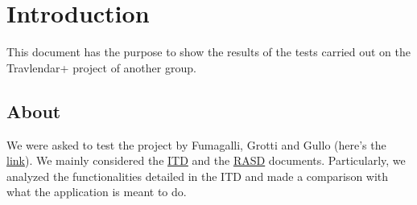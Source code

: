 \chapter{Introduction}
\label{cha:intro}

This document has the purpose to show the results of the tests carried out on the Travlendar+ project of another group.

\section{About}
\label{sec:about}
We were asked to test the project by Fumagalli, Grotti and Gullo (here's the \href{https://github.com/Aestor/FumagalliGrottiGullo}{link}). We mainly considered the \href{https://github.com/Aestor/FumagalliGrottiGullo/blob/master/DeliveryFolder/ITD1.pdf}{ITD} and the \href{https://github.com/Aestor/FumagalliGrottiGullo/blob/master/DeliveryFolder/RASD.pdf}{RASD} documents. Particularly, we analyzed the functionalities detailed in the ITD and made a comparison with what the application is meant to do. 